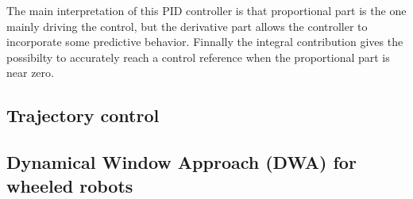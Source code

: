 The main interpretation of this PID controller is that proportional part is the one mainly driving the control, but the derivative part allows the controller to incorporate some predictive behavior. Finnally the integral contribution gives the possibilty to accurately reach a control reference when the proportional part is near zero.


\subsection{Trajectory control}

\subsection{Dynamical Window Approach (DWA) for wheeled robots}
